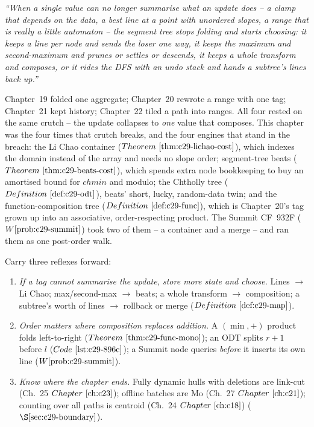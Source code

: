 \begin{lastword}
\emph{``When a single value can no longer summarise what an update does -- a clamp that depends on the
data, a best line at a point with unordered slopes, a range that is really a little automaton -- the
segment tree stops folding and starts choosing: it keeps a line per node and sends the loser one way,
it keeps the maximum and second-maximum and prunes or settles or descends, it keeps a whole transform
and composes, or it rides the DFS with an undo stack and hands a subtree's lines back up.''}

\medskip
Chapter~19 folded one aggregate; Chapter~20 rewrote a range with one tag; Chapter~21 kept history;
Chapter~22 tiled a path into ranges. All four rested on the same crutch -- the update collapses to
\emph{one} value that composes. This chapter was the four times that crutch breaks, and the four
engines that stand in the breach: the Li Chao container (\(\thmref{c29-lichao-cost}\)), which indexes
the domain instead of the array and needs no slope order; segment-tree beats
(\(\thmref{c29-beats-cost}\)), which spends extra node bookkeeping to buy an amortised bound for
\(\mathit{chmin}\) and modulo; the Chtholly tree (\(\defref{c29-odt}\)), beats' short, lucky,
random-data twin; and the function-composition tree (\(\defref{c29-func}\)), which is Chapter~20's tag
grown up into an associative, order-respecting product. The Summit CF~932F (\(\probref{c29-summit}\))
took two of them -- a container and a merge -- and ran them as one post-order walk.

\medskip
Carry three reflexes forward:
\begin{enumerate}[nosep, leftmargin=1.6em]
  \item \emph{If a tag cannot summarise the update, store more state and choose.} Lines \(\to\) Li Chao;
        max/second-max \(\to\) beats; a whole transform \(\to\) composition; a subtree's worth of lines
        \(\to\) rollback or merge (\(\defref{c29-map}\)).
  \item \emph{Order matters where composition replaces addition.} A \((\min,+)\) product folds
        left-to-right (\(\thmref{c29-func-mono}\)); an ODT splits \(r+1\) before \(l\)
        (\(\coderef{c29-896c}\)); a Summit node queries \emph{before} it inserts its own line
        (\(\probref{c29-summit}\)).
  \item \emph{Know where the chapter ends.} Fully dynamic hulls with deletions are link-cut
        (Ch.~25 \(\chref{c23}\)); offline batches are Mo (Ch.~27 \(\chref{c21}\)); counting over all
        paths is centroid (Ch.~24 \(\chref{c18}\)) (\(\secref{c29-boundary}\)).
\end{enumerate}


\end{lastword}
